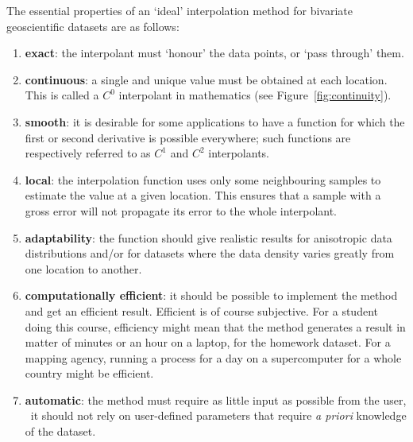 The essential properties of an `ideal' interpolation method for bivariate geoscientific datasets are as follows:
\begin{enumerate}
  \item \textbf{exact}: the interpolant must `honour' the data points, or `pass through' them.
  \item \textbf{continuous}: a single and unique value must be obtained at each location. This is called a $C^0$ interpolant in mathematics (see Figure~\ref{fig:continuity}).
  \item \textbf{smooth}: it is desirable for some applications to have a function for which the first or second derivative is possible everywhere; such functions are respectively referred to as $C^1$ and $C^2$ interpolants.
  \item \textbf{local}: the interpolation function uses only some neighbouring samples to estimate the value at a given location. This ensures that a sample with a gross error will not propagate its error to the whole interpolant.
  \item \textbf{adaptability}: the function should give realistic results for anisotropic data distributions and/or for datasets where the data density varies greatly from one location to another.
  \item \textbf{computationally efficient}: it should be possible to implement the method and get an efficient result. Efficient is of course subjective. For a student doing this course, efficiency might mean that the method generates a result in matter of minutes or an hour on a laptop, for the homework dataset. For a mapping agency, running a process for a day on a supercomputer for a whole country might be efficient.
  \item \textbf{automatic}: the method must require as little input as possible from the user, \ie\ it should not rely on user-defined parameters that require \emph{a priori} knowledge of the dataset.
\end{enumerate}

